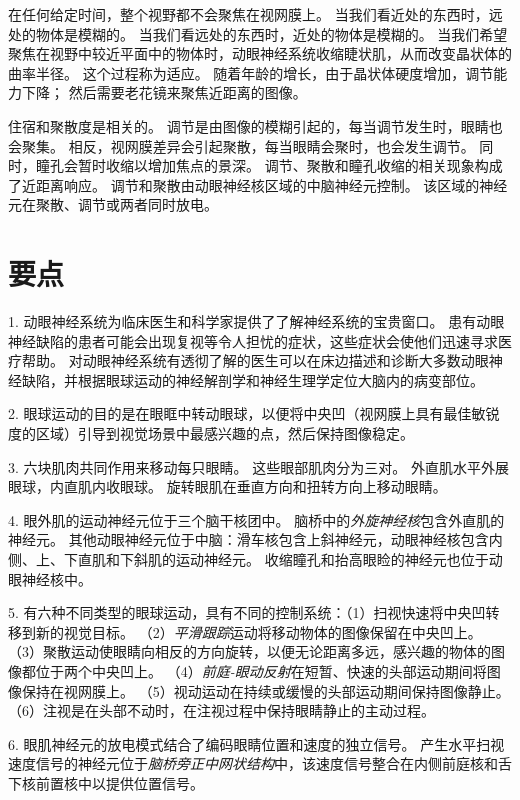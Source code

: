 在任何给定时间，整个视野都不会聚焦在视网膜上。
当我们看近处的东西时，远处的物体是模糊的。
当我们看远处的东西时，近处的物体是模糊的。
当我们希望聚焦在视野中较近平面中的物体时，动眼神经系统收缩睫状肌，从而改变晶状体的曲率半径。
这个过程称为适应。
随着年龄的增长，由于晶状体硬度增加，调节能力下降； 然后需要老花镜来聚焦近距离的图像。


住宿和聚散度是相关的。
调节是由图像的模糊引起的，每当调节发生时，眼睛也会聚集。
相反，视网膜差异会引起聚散，每当眼睛会聚时，也会发生调节。
同时，瞳孔会暂时收缩以增加焦点的景深。
调节、聚散和瞳孔收缩的相关现象构成了近距离响应。
调节和聚散由动眼神经核区域的中脑神经元控制。
该区域的神经元在聚散、调节或两者同时放电。



\section{要点}

1. 动眼神经系统为临床医生和科学家提供了了解神经系统的宝贵窗口。
患有动眼神经缺陷的患者可能会出现复视等令人担忧的症状，这些症状会使他们迅速寻求医疗帮助。
对动眼神经系统有透彻了解的医生可以在床边描述和诊断大多数动眼神经缺陷，并根据眼球运动的神经解剖学和神经生理学定位大脑内的病变部位。


2. 眼球运动的目的是在眼眶中转动眼球，以便将中央凹（视网膜上具有最佳敏锐度的区域）引导到视觉场景中最感兴趣的点，然后保持图像稳定。


3. 六块肌肉共同作用来移动每只眼睛。
这些眼部肌肉分为三对。
外直肌水平外展眼球，内直肌内收眼球。
旋转眼肌在垂直方向和扭转方向上移动眼睛。


4. 眼外肌的运动神经元位于三个脑干核团中。
脑桥中的\textit{外旋神经核}包含外直肌的神经元。
其他动眼神经元位于中脑：滑车核包含上斜神经元，动眼神经核包含内侧、上、下直肌和下斜肌的运动神经元。
收缩瞳孔和抬高眼睑的神经元也位于动眼神经核中。


5. 有六种不同类型的眼球运动，具有不同的控制系统：（1）扫视快速将中央凹转移到新的视觉目标。
（2）\textit{平滑跟踪}运动将移动物体的图像保留在中央凹上。
（3）聚散运动使眼睛向相反的方向旋转，以便无论距离多远，感兴趣的物体的图像都位于两个中央凹上。
（4）\textit{前庭-眼动反射}在短暂、快速的头部运动期间将图像保持在视网膜上。
（5）视动运动在持续或缓慢的头部运动期间保持图像静止。
（6）注视是在头部不动时，在注视过程中保持眼睛静止的主动过程。


6. 眼肌神经元的放电模式结合了编码眼睛位置和速度的独立信号。
产生水平扫视速度信号的神经元位于\textit{脑桥旁正中网状结构}中，该速度信号整合在内侧前庭核和舌下核前置核中以提供位置信号。


